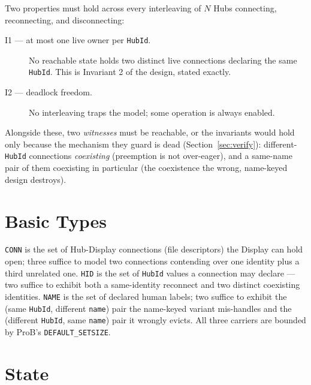 \documentclass[a4paper,10pt,fleqn]{article}
\begin{document}
Two properties must hold across every interleaving of $N$ Hubs
connecting, reconnecting, and disconnecting:

\begin{description}
  \item[I1 --- at most one live owner per \texttt{HubId}.] No reachable
    state holds two distinct live connections declaring the same
    \texttt{HubId}.  This is Invariant 2 of the design, stated exactly.
  \item[I2 --- deadlock freedom.] No interleaving traps the model; some
    operation is always enabled.
\end{description}

Alongside these, two \emph{witnesses} must be reachable, or the
invariants would hold only because the mechanism they guard is dead
(Section~\ref{sec:verify}): different-\texttt{HubId} connections
\emph{coexisting} (preemption is not over-eager), and a same-name pair of
them coexisting in particular (the coexistence the wrong, name-keyed
design destroys).

\section{Basic Types}

\begin{zed}
\end{zed}

\texttt{CONN} is the set of Hub-Display connections (file descriptors)
the Display can hold open; three suffice to model two connections
contending over one identity plus a third unrelated one.  \texttt{HID} is
the set of \texttt{HubId} values a connection may declare --- two suffice
to exhibit both a same-identity reconnect and two distinct coexisting
identities.  \texttt{NAME} is the set of declared human labels; two
suffice to exhibit the (same \texttt{HubId}, different \texttt{name}) pair
the name-keyed variant mis-handles and the (different \texttt{HubId},
same \texttt{name}) pair it wrongly evicts.  All three carriers are
bounded by ProB's \texttt{DEFAULT\_SETSIZE}.

\section{State}
\end{document}
